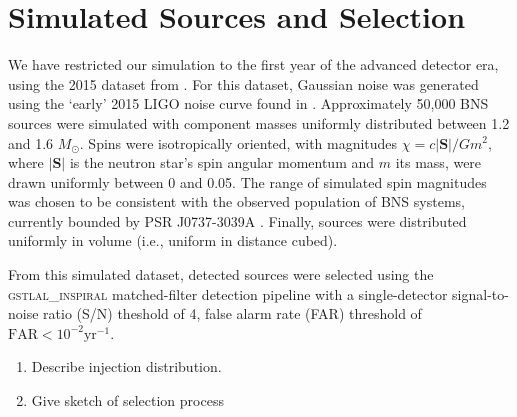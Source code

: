 \section{Simulated Sources and Selection}

We have restricted our simulation to the first year of the advanced detector era, using the 2015 dataset from \citet{Singer_2014}.  For this dataset, Gaussian noise was generated using the `early' 2015 LIGO noise curve found in \cite{Barsotti:2012}.  Approximately 50,000 BNS sources were simulated with component masses uniformly distributed between 1.2 and 1.6 $M_\odot$.  Spins were isotropically oriented, with magnitudes $\chi = c |\mathbf{S}|/G m^2$, where $|\mathbf{S}|$ is the neutron star's spin angular momentum and $m$ its mass, were drawn uniformly between 0 and 0.05.  The range of simulated spin magnitudes was chosen to be consistent with the observed population of BNS systems, currently bounded by PSR J0737-3039A \cite{Burgay_2003,Brown_2012}.  Finally, sources were distributed uniformly in volume (i.e., uniform in distance cubed).

From this simulated dataset, detected sources were selected using the \textsc{gstlal\_inspiral} matched-filter detection pipeline \cite{Cannon_2012} with a single-detector signal-to-noise ratio (S/N) theshold of 4, false alarm rate (FAR) threshold of $\mathrm{FAR}<10^{-2}\mathrm{yr}^{-1}$.  

\begin{enumerate}
\item Describe injection distribution.
\item Give sketch of selection process
\end{enumerate}